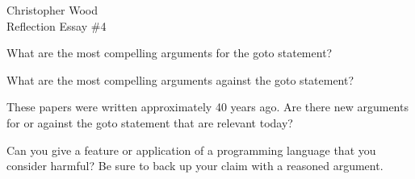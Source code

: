 \documentclass[12pt,letterpaper]{article}
\begin{document}
\begin{center}
Christopher Wood \\
Reflection Essay \#4 \\
\end{center}

\begin{questions}
What are the most compelling arguments for the goto statement?

What are the most compelling arguments against the goto statement?

These papers were written approximately 40 years ago. Are there new arguments for or against the goto statement that are relevant 
today?

Can you give a feature or application of a programming language that you consider harmful? Be sure to back up your claim with a reasoned argument.
\end{questions}




\end{document}

